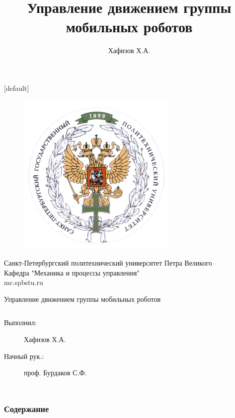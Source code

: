 \documentclass[10pt]{beamer}
\makeatletter
\newenvironment{withoutheadline}{
	\setbeamertemplate{headline}[default]
	\def\beamer@entrycode{\vspace*{-\headheight}}
}{}
\makeatother
\begin{document}
\title{Управление движением группы мобильных роботов}
\author{Хафизов Х.А.}
\begin{withoutheadline}
\begin{frame}
	
	\begin{figure}
		\centering
		\includegraphics[width=0.2\linewidth]{others/SPbSPU_Logo}
		\label{fig:spbspulogo}
	\end{figure}
	\begin{center}

	\small Санкт-Петербургский политехнический университет Петра Великого \\
	Кафедра "Механика и процессы управления" \\
	mc.spbstu.ru\par
	\bigskip
	Управление движением группы мобильных роботов \\
	\end{center}
	\begin{columns}[T]%
		\begin{description}
			\item[Выполнил:] Хафизов Х.А.
			\item[Начный рук.:] проф. Бурдаков С.Ф.
		\end{description}
	\end{columns}
	
\end{frame}
\end{withoutheadline}
\begin{frame}
	\frametitle{Содержание}
	\tableofcontents
\end{frame}
\end{document}
